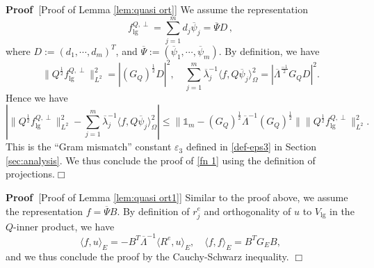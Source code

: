 \documentclass[11pt,a4paper]{article}
\numberwithin{equation}{section}
\newcommand{\assign}{:=}
\newcommand{\tmop}[1]{\ensuremath{\operatorname{#1}}}
\newenvironment{proof}{\noindent\textbf{Proof\ }}{\hspace*{\fill}$\Box$\medskip}
\begin{document}
\begin{proof}[Proof of Lemma \ref{lem:quasi ort}]
We assume the  representation \[f^{Q,\perp}_{\tmop{lg}}=\sum_{j = 1}^m d_j\overline\psi_j=\overline{\Psi}D\,,\]
where $D\assign(d_1,\cdots,d_m)^T$, and $\overline{\Psi}\assign(\overline\psi_1,\cdots,\overline\psi_m)$. 
By definition, we have 
\begin{equation}
    \label{eq111}\|Q^{\frac{1}{2}}f^{Q,\perp}_{\tmop{lg}}\|^2_{L^2}=|(G_Q)^{\frac{1}{2}}D|^2,\quad \sum_{j = 1}^m \overline\lambda_j^{-1} \langle f, Q\overline\psi_j \rangle_{\Omega} ^2 =|\overline\Lambda^{\frac{-1}{2}}G_QD|^2.
\end{equation}
     Hence we have
\[|\|Q^{\frac{1}{2}}f^{Q,\perp}_{\tmop{lg}}\|^2_{L^2}-\sum_{j = 1}^m \overline\lambda_j^{-1} \langle f, Q\overline\psi_j \rangle_{\Omega} ^2|\leqslant\|\mathbb{1}_{m}-(G_Q)^{\frac{1}{2}}\overline\Lambda^{-1}(G_Q)^{\frac{1}{2}}\|\|Q^{\frac{1}{2}}f^{Q,\perp}_{\tmop{lg}}\|^2_{L^2}.\]This is the ``Gram mismatch'' constant $\varepsilon_3$ defined in \eqref{def-eps3} in Section \ref{sec:analysis}.
We thus conclude the proof of \eqref{fn 1}
 using the definition of projections.\end{proof}
 
 \begin{proof}[Proof of Lemma \ref{lem:quasi ort1}] Similar to the proof above, we assume the representation $f=\overline{\Psi}B$. By definition of $r^e_j$ and orthogonality of $u$ to $V_{\tmop{lg}}$ in the $Q$-inner product, we have $$\langle f, u \rangle_{E}=-B^T\overline\Lambda^{-1}\langle R^e, u \rangle_{E},\quad \langle f, f \rangle_{E}=B^TG_EB,$$
 and we thus conclude the proof by the Cauchy-Schwarz inequality.
 \end{proof}
\end{document}
